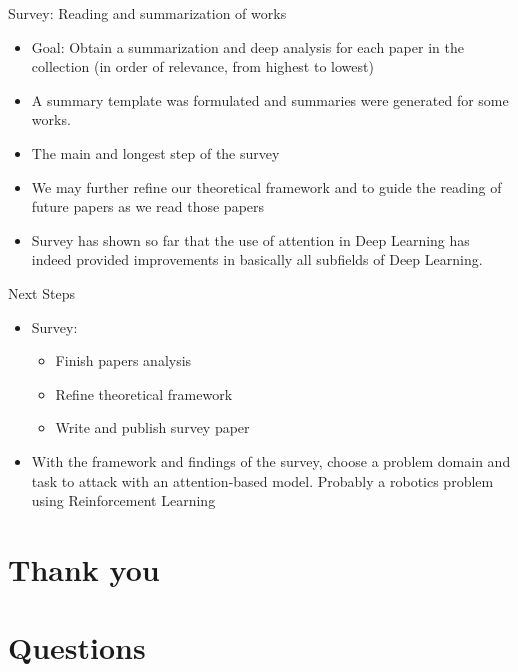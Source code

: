 \documentclass[10pt]{beamer}
\begin{document}
\begin{frame}{Survey: Reading and summarization of works}
    \begin{itemize}
        \item Goal: Obtain a summarization and deep analysis for each paper in the collection
            (in order of relevance, from highest to lowest)
        \item A summary template was formulated and summaries were generated for some works.
        \item The main and longest step of the survey
        \item We may further refine our theoretical framework and to guide the reading of future papers as we read those papers
        \item Survey has shown so far that the use of attention in Deep Learning has indeed provided improvements in basically all
subfields of Deep Learning.
    \end{itemize}
\end{frame}

\begin{frame}{Next Steps}
    \begin{itemize}
        \item Survey:
        \begin{itemize}
            \item Finish papers analysis
            \item Refine theoretical framework
            \item Write and publish survey paper
        \end{itemize}
    \item With the framework and findings of the survey, choose a problem domain and task to attack with an attention-based model. Probably a robotics problem using Reinforcement Learning
    \end{itemize}
\end{frame}

\section{Thank you}

\section{Questions}

\end{document}
